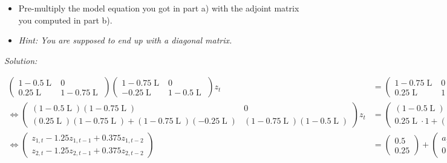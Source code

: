 \documentclass[12pt,a4paper]{article}
\newcommand{\Lag}{\operatorname{L}} %
\begin{document}
\begin{itemize}
    \item[c)]Pre-multiply the model equation you got in part a) with the adjoint matrix you computed in part b).
    \item[]  \textit{Hint: You are supposed to end up with a diagonal matrix.}
\end{itemize}

\emph{Solution:}

\begin{tiny}
\begin{align*}
  \begin{pmatrix} 1- 0.5 \Lag & 0 \\ 0.25 \Lag & 1 - 0.75 \Lag  \end{pmatrix} \begin{pmatrix} 1- 0.75 \Lag & 0 \\ -0.25 \Lag & 1 - 0.5 \Lag  \end{pmatrix} z_t & = \begin{pmatrix} 1 - 0.75 \Lag & 0 \\ 0.25 \Lag & 1 - 0.75 \Lag \end{pmatrix} \cdot \left( \phi_0 + a_t \right) \\
  \Leftrightarrow \begin{pmatrix} (1- 0.5 \Lag) (1- 0.75 \Lag) & 0 \\
  (0.25 \Lag) (1 - 0.75 \Lag) + (1 - 0.75 \Lag) (-0.25 \Lag) & (1 - 0.75 \Lag) (1 - 0.5 \Lag)
  \end{pmatrix} z_t  & = 
  \begin{pmatrix} (1 - 0.5 \Lag) \cdot 1 \\ 0.25 \Lag \cdot 1 +(1- 0.75 \Lag) \cdot 0 \end{pmatrix} +  
  \begin{pmatrix} (1 - 0.5 \Lag) \cdot a_{1,t} \\ (0.25 \Lag ) a_{1,t} + 1 (1- 0.75 \Lag) a_{2,t}\end{pmatrix} \\
  \Leftrightarrow \begin{pmatrix} z_{1,t} - 1.25 z_{1, t-1} + 0.375 z_{1, t-2} \\ z_{2,t} - 1.25 z_{2, t-1} + 0.375 z_{2, t-2} \end{pmatrix} 
  & = \begin{pmatrix} 0.5 \\ 0.25 \end{pmatrix} + \begin{pmatrix} a_{1,t} - 0.5 a_{1, t-1} \\ 
  0 + 0.25 a_{1, t-1} + a_{2,t} - 0.75 a_{2, t-1}\end{pmatrix}  
\end{align*}
\end{tiny}
\end{document}

